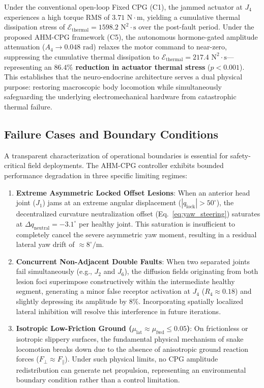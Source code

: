 \documentclass{iopjournal}
\begin{document}
Under the conventional open-loop Fixed CPG (C1), the jammed actuator at $J_4$ experiences a high torque RMS of $3.71\text{ N}\cdot\text{m}$, yielding a cumulative thermal dissipation stress of $\mathcal{E}_{\text{thermal}} = 1598.2\text{ N}^2\cdot\text{s}$ over the post-fault period. Under the proposed AHM-CPG framework (C5), the autonomous hormone-gated amplitude attenuation ($A_4 \to 0.048\text{ rad}$) relaxes the motor command to near-zero, suppressing the cumulative thermal dissipation to $\mathcal{E}_{\text{thermal}} = 217.4\text{ N}^2\cdot\text{s}$—representing an \textbf{$86.4\%$ reduction in actuator thermal stress} ($p < 0.001$). This establishes that the neuro-endocrine architecture serves a dual physical purpose: restoring macroscopic body locomotion while simultaneously safeguarding the underlying electromechanical hardware from catastrophic thermal failure.

\subsection{Failure Cases and Boundary Conditions}

A transparent characterization of operational boundaries is essential for safety-critical field deployments. The AHM-CPG controller exhibits bounded performance degradation in three specific limiting regimes:
\begin{enumerate}
  \item \textbf{Extreme Asymmetric Locked Offset Lesions}: When an anterior head joint ($J_1$) jams at an extreme angular displacement ($|q_{\text{lock}}| > 50^\circ$), the decentralized curvature neutralization offset (Eq.~\ref{eq:yaw_steering}) saturates at $\Delta q_{\text{neutral}} = -3.1^\circ$ per healthy joint. This saturation is insufficient to completely cancel the severe asymmetric yaw moment, resulting in a residual lateral yaw drift of $\approx 8^\circ\text{/m}$.
  \item \textbf{Concurrent Non-Adjacent Double Faults}: When two separated joints fail simultaneously (e.g., $J_2$ and $J_6$), the diffusion fields originating from both lesion foci superimpose constructively within the intermediate healthy segment, generating a minor false receptor activation at $J_4$ ($R_4 \approx 0.18$) and slightly depressing its amplitude by $8\%$. Incorporating spatially localized lateral inhibition will resolve this interference in future iterations.
  \item \textbf{Isotropic Low-Friction Ground ($\mu_{\text{lat}} \approx \mu_{\text{fwd}} \le 0.05$)}: On frictionless or isotropic slippery surfaces, the fundamental physical mechanism of snake locomotion breaks down due to the absence of anisotropic ground reaction forces ($F_{\perp} \approx F_{\parallel}$). Under such physical limits, no CPG amplitude redistribution can generate net propulsion, representing an environmental boundary condition rather than a control limitation.
\end{enumerate}
\end{document}
